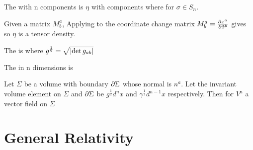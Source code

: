 \documentclass{article}
\begin{document}
\begin{definition}
The  with n components is $\eta$ with components 
where
for $\sigma \in S_n$. 
\end{definition}

\begin{lemma}
Given a matrix $M^a_b$, 
Applying to the coordinate change matrix $M^a_b = \pd[x^a]{\tilde{x}^b}$ gives 
so $\eta$ is a tensor density. 
\end{lemma}

\begin{definition}
The  is 
where $g^\frac{1}{2} = \sqrt{\abs{\det g_{ab}}}$
\end{definition}

\begin{definition}
The  in n dimensions is  
\end{definition}

\begin{theorem}
Let $\Sigma$ be a volume with boundary $\del \Sigma$ whose normal is $n^a$. Let the invariant volume element on $\Sigma$ and $\del \Sigma$ be $g^\frac{1}{2} d^n x $ and $\gamma^\frac{1}{2} d^{n-1}x$ respectively. Then for $V^a$ a vector field on $\Sigma$ 
\end{theorem}


\section{General Relativity}
\end{document}
